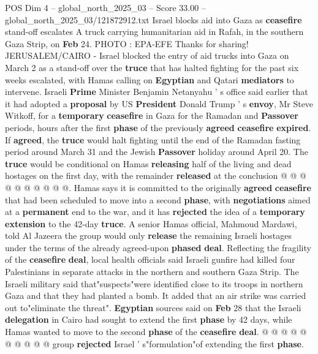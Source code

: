 \begin{textsample}{POS Dim 4 – global\_north\_2025\_03 – Score 33.00 – global\_north\_2025\_03/121872912.txt}  \label{ex:f4_pos_063}
Israel blocks aid into Gaza as \textbf{ceasefire} stand-off escalates A truck carrying humanitarian aid in Rafah, in the southern Gaza Strip, on \textbf{Feb} 24.
PHOTO : EPA-EFE Thanks for sharing!
JERUSALEM/CAIRO - Israel blocked the entry of aid trucks into Gaza on March 2 as a stand-off over the \textbf{truce} that has halted fighting for the past six weeks escalated, with Hamas calling on \textbf{Egyptian} and Qatari \textbf{mediators} to intervene.
Israeli \textbf{Prime} Minister Benjamin Netanyahu ' s office said earlier that it had adopted a \textbf{proposal} by US \textbf{President} Donald Trump ' s \textbf{envoy}, Mr Steve Witkoff, for a \textbf{temporary} \textbf{ceasefire} in Gaza for the Ramadan and \textbf{Passover} periods, hours after the first \textbf{phase} of the previously \textbf{agreed} \textbf{ceasefire} \textbf{expired}.
If \textbf{agreed}, the \textbf{truce} would halt fighting until the end of the Ramadan fasting period around March 31 and the Jewish \textbf{Passover} holiday around April 20.
The \textbf{truce} would be conditional on Hamas \textbf{releasing} half of the living and dead hostages on the first day, with the remainder \textbf{released} at the conclusion @ @ @ @ @ @ @ @ @ @.
Hamas says it is committed to the originally \textbf{agreed} \textbf{ceasefire} that had been scheduled to move into a second \textbf{phase}, with \textbf{negotiations} aimed at a \textbf{permanent} end to the war, and it has \textbf{rejected} the idea of a \textbf{temporary} \textbf{extension} to the 42-day \textbf{truce}.
A senior Hamas official, Mahmoud Mardawi, told Al Jazeera the group would only \textbf{release} the remaining Israeli hostages under the terms of the already agreed-upon \textbf{phased} \textbf{deal}.
Reflecting the fragility of the \textbf{ceasefire} \textbf{deal}, local health officials said Israeli gunfire had killed four Palestinians in separate attacks in the northern and southern Gaza Strip.
The Israeli military said that"suspects"were identified close to its troops in northern Gaza and that they had planted a bomb.
It added that an air strike was carried out to"eliminate the threat". \textbf{Egyptian} sources said on \textbf{Feb} 28 that the Israeli \textbf{delegation} in Cairo had sought to extend the first \textbf{phase} by 42 days, while Hamas wanted to move to the second \textbf{phase} of the \textbf{ceasefire} \textbf{deal}. @ @ @ @ @ @ @ @ @ @ group \textbf{rejected} Israel ' s"formulation"of extending the first \textbf{phase}.

\end{textsample}
